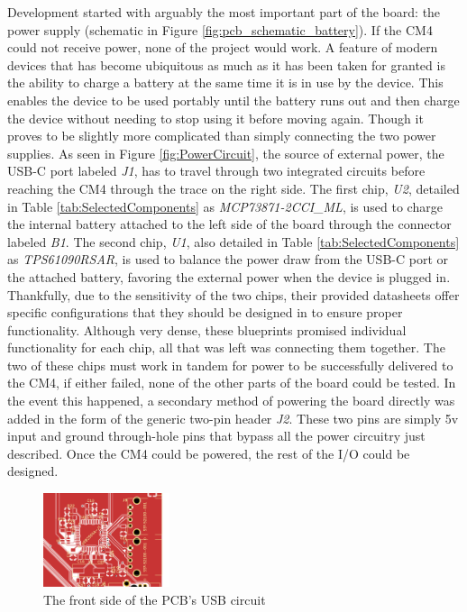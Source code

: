 Development started with arguably the most important part of the board: the power supply (schematic in Figure \ref{fig:pcb_schematic_battery}).
If the CM4 could not receive power, none of the project would work.
A feature of modern devices that has become ubiquitous as much as it has been taken for granted is the ability to charge a battery at the same time it is in use by the device.
This enables the device to be used portably until the battery runs out and then charge the device without needing to stop using it before moving again.
Though it proves to be slightly more complicated than simply connecting the two power supplies.
As seen in Figure \ref{fig:PowerCircuit}, the source of external power, the USB-C port labeled \emph{J1}, has to travel through two integrated circuits before reaching the CM4 through the trace on the right side.
The first chip, \emph{U2}, detailed in Table \ref{tab:SelectedComponents} as \emph{MCP73871-2CCI\_ML}, is used to charge the internal battery attached to the left side of the board through the connector labeled \emph{B1}.
The second chip, \emph{U1}, also detailed in Table \ref{tab:SelectedComponents} as \emph{TPS61090RSAR}, is used to balance the power draw from the USB-C port or the attached battery, favoring the external power when the device is plugged in.
Thankfully, due to the sensitivity of the two chips, their provided datasheets offer specific configurations that they should be designed in to ensure proper functionality.
Although very dense, these blueprints promised individual functionality for each chip, all that was left was connecting them together.
The two of these chips must work in tandem for power to be successfully delivered to the CM4, if either failed, none of the other parts of the board could be tested.
In the event this happened, a secondary method of powering the board directly was added in the form of the generic two-pin header \emph{J2}.
These two pins are simply 5v input and ground through-hole pins that bypass all the power circuitry just described.
Once the CM4 could be powered, the rest of the I/O could be designed.

\begin{figure}[t]
  \centering
  \includegraphics[width=0.33\textwidth]{Figures/kicad/close-ups/usb-front}
  \caption[PCB USB Circuit]{The front side of the PCB's USB circuit}
  \label{fig:USBCircuit}
\end{figure}

